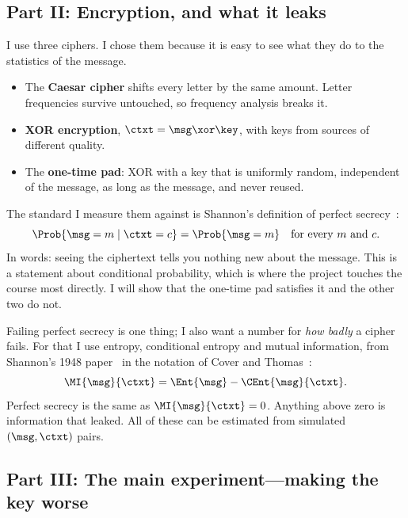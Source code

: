 \subsection{Part II: Encryption, and what it leaks}

I use three ciphers. I chose them because it is easy to see what they do to
the statistics of the message.
\begin{itemize}
  \item The \textbf{Caesar cipher} shifts every letter by the same amount.
        Letter frequencies survive untouched, so frequency analysis breaks
        it.
  \item \textbf{XOR encryption}, $\ctxt = \msg \xor \key$, with keys from
        sources of different quality.
  \item The \textbf{one-time pad}: XOR with a key that is uniformly random,
        independent of the message, as long as the message, and never
        reused.
\end{itemize}
The standard I measure them against is Shannon's definition of perfect
secrecy~\cite{shannon1949}:
\[
  \Prob{\msg = m \mid \ctxt = c} = \Prob{\msg = m}
  \quad\text{for every } m \text{ and } c .
\]
In words: seeing the ciphertext tells you nothing new about the message. This
is a statement about conditional probability, which is where the project
touches the course most directly. I will show that the one-time pad satisfies
it and the other two do not.

Failing perfect secrecy is one thing; I also want a number for \emph{how
badly} a cipher fails. For that I use entropy, conditional entropy and mutual
information, from Shannon's 1948 paper~\cite{shannon1948} in the notation of
Cover and Thomas~\cite{cover2006}:
\[
  \MI{\msg}{\ctxt} = \Ent{\msg} - \CEnt{\msg}{\ctxt} .
\]
Perfect secrecy is the same as $\MI{\msg}{\ctxt} = 0$. Anything above zero is
information that leaked. All of these can be estimated from simulated
$(\msg, \ctxt)$ pairs.

\subsection{Part III: The main experiment---making the key worse}

